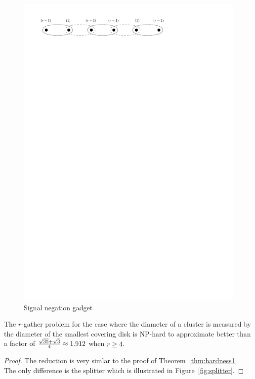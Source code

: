 \begin{figure}[htbp]
\begin{center}
\includegraphics[scale=.6]{figs/negation}
\caption{Signal negation gadget}
\label{fig:negation}
\end{center}
\vspace{-5pt}
\end{figure}

\begin{theorem}\label{thm:hardness2}
The $r$-gather problem for the case where the diameter of a cluster is measured by the diameter of the smallest covering disk is NP-hard to approximate better than a factor of ${\sqrt{35}+\sqrt{3} \over 4} \approx 1.912$ when $r\geq4$.
\end{theorem}
\begin{proof}
The reduction is very simlar to the proof of Theorem~\ref{thm:hardness1}.  The only difference is the splitter which is illustrated in Figure~\ref{fig:splitter}.
\end{proof}


